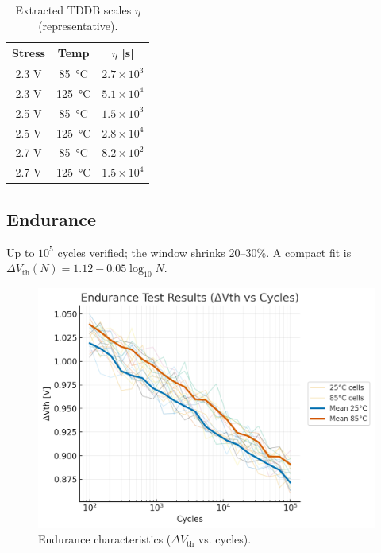 \documentclass[conference]{IEEEtran}
\begin{document}
\begin{table}[t]
\centering
\caption{Extracted TDDB scales \(\eta\) (representative).}
\begin{tabular}{@{}ccc@{}}
\toprule
Stress & Temp & \(\eta\) [s] \\
\midrule
2.3 V & \SI{85}{\celsius}  & \(2.7\times 10^{3}\) \\
2.3 V & \SI{125}{\celsius} & \(5.1\times 10^{4}\) \\
2.5 V & \SI{85}{\celsius}  & \(1.5\times 10^{3}\) \\
2.5 V & \SI{125}{\celsius} & \(2.8\times 10^{4}\) \\
2.7 V & \SI{85}{\celsius}  & \(8.2\times 10^{2}\) \\
2.7 V & \SI{125}{\celsius} & \(1.5\times 10^{4}\) \\
\bottomrule
\end{tabular}
\end{table}

\subsection{Endurance}
Up to \(10^{5}\) cycles verified; the window shrinks 20–30\%.
A compact fit is \(\Delta V_\mathrm{th}(N)=1.12-0.05\log_{10}N\).
\begin{figure}[t]
\centering
\includegraphics[width=\linewidth]{figures/fig5_endurance.png}
\caption{Endurance characteristics (\(\Delta V_{\mathrm{th}}\) vs. cycles).}
\label{fig:endurance}
\end{figure}
\end{document}
